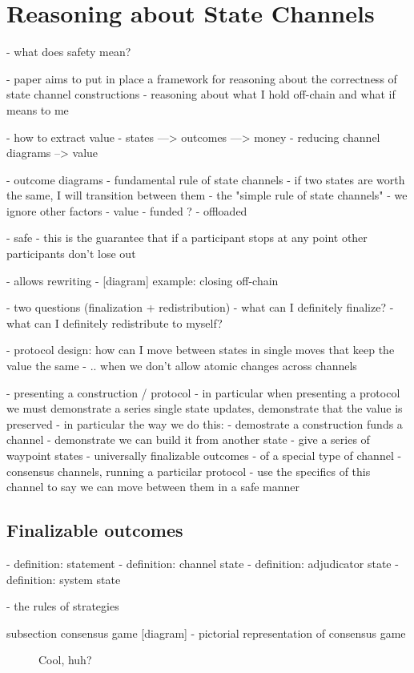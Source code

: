 \section{Reasoning about State Channels}\label{sec:reasoning}

- what does safety mean?

- paper aims to put in place a framework for reasoning about the correctness of state channel constructions
- reasoning about what I hold off-chain and what if means to me

- how to extract value
- states ---> outcomes ---> money
- reducing channel diagrams --> value

- outcome diagrams
- fundamental rule of state channels - if two states are worth the same, I will transition between them
- the "simple rule of state channels" - we ignore other factors
- value
- funded ?
- offloaded

- safe
- this is the guarantee that if a participant stops at any point other participants don't lose out

- allows rewriting
- [diagram] example: closing off-chain

- two questions (finalization + redistribution)
  - what can I definitely finalize?
  - what can I definitely redistribute to myself?

- protocol design: how can I move between states in single moves that keep the value the same
- .. when we don't allow atomic changes across channels

- presenting a construction / protocol
- in particular when presenting a protocol we must demonstrate a series single state updates, demonstrate that the value is preserved
- in particular the way we do this:
  - demostrate a construction funds a channel
  - demonstrate we can build it from another state
    - give a series of waypoint states - universally finalizable outcomes
    - of a special type of channel - consensus channels, running a particilar protocol
    - use the specifics of this channel to say we can move between them in a safe manner


\subsection{Finalizable outcomes}

- definition: statement
- definition: channel state
- definition: adjudicator state
- definition: system state

- the rules of strategies

subsection consensus game
[diagram] - pictorial representation of consensus game

\begin{figure}[h]\centering
  \makebox[\textwidth][c]{}
  \caption{Cool, huh?}
\end{figure}

